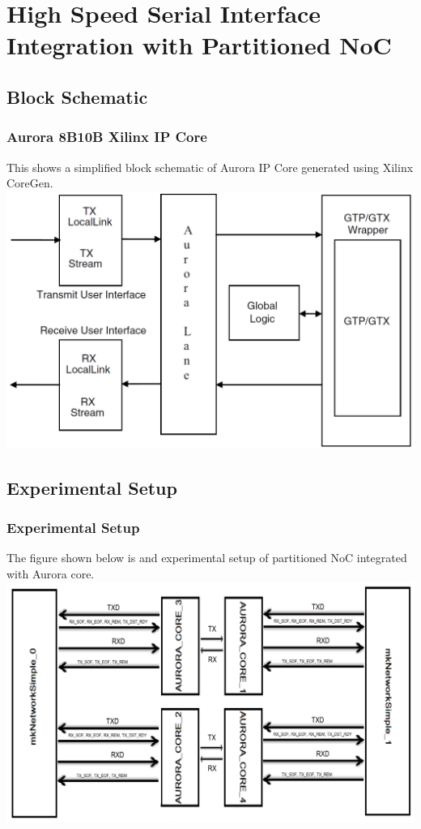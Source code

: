 
\section{High Speed Serial Interface Integration with Partitioned NoC}
\subsection{Block Schematic}
\begin{frame}
\frametitle{Aurora 8B10B Xilinx IP Core}
This shows a simplified block schematic of Aurora IP Core generated using Xilinx CoreGen.\\
	\centering
	\includegraphics[scale=0.2]{./figs/auroraTop}
\end{frame}

\subsection{Experimental Setup}
\begin{frame}
\frametitle{Experimental Setup}
The figure shown below is and experimental setup of partitioned NoC integrated with Aurora core.\\
	\centering
	\includegraphics[scale=0.2]{./figs/PartitioningArchitecture}
\end{frame}

